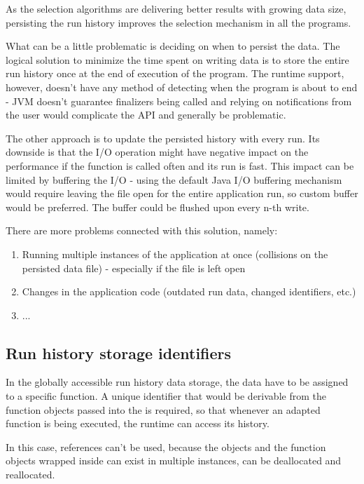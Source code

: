 As the selection algorithms are delivering better results with growing data size, persisting the run history improves the selection mechanism in all the programs.

What can be a little problematic is deciding on when to persist the data. The logical solution to minimize the time spent on writing data is to store the entire run history once at the end of execution of the program. The runtime support, however, doesn't have any method of detecting when the program is about to end - JVM doesn't guarantee finalizers being called and relying on notifications from the user would complicate the API and generally be problematic.

The other approach is to update the persisted history with every run. Its downside is that the I/O operation might have negative impact on the performance if the function is called often and its run is fast. This impact can be limited by buffering the I/O - using the default Java I/O buffering mechanism would require leaving the file open for the entire application run, so custom buffer would be preferred. The buffer could be flushed upon every n-th write.

There are more problems connected with this solution, namely:
\begin{enumerate}
	\item Running multiple instances of the application at once (collisions on the persisted data file) - especially if the file is left open
	\item Changes in the application code (outdated run data, changed identifiers, etc.)
	\item ...
\end{enumerate}


\subsection{Run history storage identifiers}

In the globally accessible run history data storage, the data have to be assigned to a specific function. A unique identifier that would be derivable from the function objects passed into the  is required, so that whenever an adapted function is being executed, the runtime can access its history. 

In this case, references can't be used, because the  objects and the function objects wrapped inside can exist in multiple instances, can be deallocated and reallocated.

